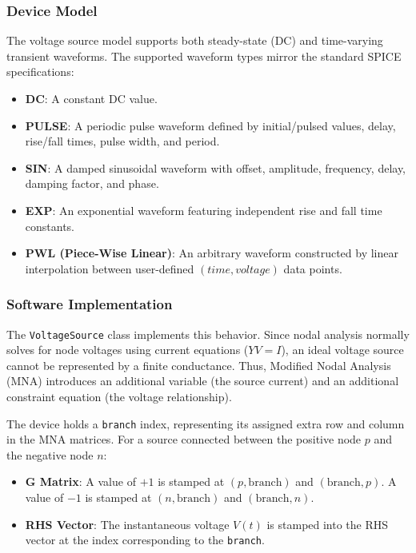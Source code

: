 \subsubsection{Device Model}
The voltage source model supports both steady-state (DC) and time-varying transient waveforms. The supported waveform types mirror the standard SPICE specifications:
\begin{itemize}
    \item \textbf{DC}: A constant DC value.
    \item \textbf{PULSE}: A periodic pulse waveform defined by initial/pulsed values, delay, rise/fall times, pulse width, and period.
    \item \textbf{SIN}: A damped sinusoidal waveform with offset, amplitude, frequency, delay, damping factor, and phase.
    \item \textbf{EXP}: An exponential waveform featuring independent rise and fall time constants.
    \item \textbf{PWL (Piece-Wise Linear)}: An arbitrary waveform constructed by linear interpolation between user-defined $(time, voltage)$ data points.
\end{itemize}

\subsubsection{Software Implementation}
The \texttt{VoltageSource} class implements this behavior. Since nodal analysis normally solves for node voltages using current equations ($Y V = I$), an ideal voltage source cannot be represented by a finite conductance. Thus, Modified Nodal Analysis (MNA) introduces an additional variable (the source current) and an additional constraint equation (the voltage relationship).

The device holds a \texttt{branch} index, representing its assigned extra row and column in the MNA matrices. 
For a source connected between the positive node $p$ and the negative node $n$:
\begin{itemize}
    \item \textbf{G Matrix}: A value of $+1$ is stamped at $(p, \text{branch})$ and $(\text{branch}, p)$. A value of $-1$ is stamped at $(n, \text{branch})$ and $(\text{branch}, n)$. 
    \item \textbf{RHS Vector}: The instantaneous voltage $V(t)$ is stamped into the RHS vector at the index corresponding to the \texttt{branch}.
\end{itemize}

